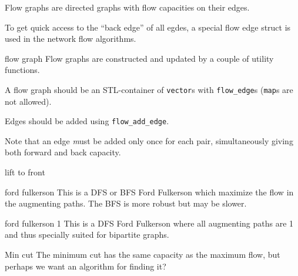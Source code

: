 
Flow graphs are directed graphs with flow capacities on their edges.

To get quick access to the ``back edge'' of all egdes, a special flow edge
struct is used in the network flow algorithms.

\begin{algorithm}{flow graph}
\desc
Flow graphs are constructed and updated by a couple of utility functions.

A flow graph should be an STL-container of {\tt vector}s with
{\tt flow\_edge}s ({\tt map}s are not allowed).

Edges should be added using {\tt flow\_add\_edge}.

Note that an edge {\emph must be} added only once for each pair,
simultaneously giving both forward and back capacity.
\end{algorithm}

\begin{algorithm}{lift to front}
\end{algorithm}

\begin{algorithm}{ford fulkerson}
\desc
This is a DFS or BFS Ford Fulkerson which maximize the flow in the
augmenting paths. The BFS is more robust but may be slower.
\end{algorithm}

\begin{algorithm}{ford fulkerson 1}
\desc
This is a DFS Ford Fulkerson where all augmenting paths
are 1 and thus specially suited for bipartite graphs.
\end{algorithm}

\begin{algorithm}{Min cut}
\desc
The minimum cut has the same capacity as the maximum flow,
but perhaps we want an algorithm for finding it?
\end{algorithm}

